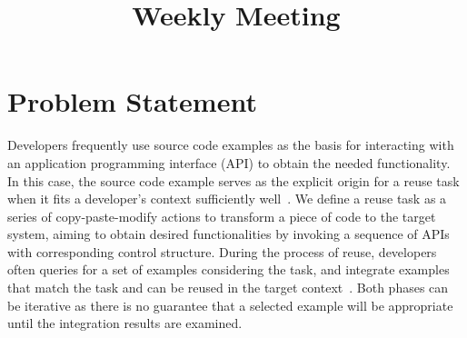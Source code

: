 \documentclass{sig-alternate}
\begin{document}



\title{Weekly Meeting } %

%
%

%
%
%

\maketitle

\section{Problem Statement}

Developers frequently use source code examples as the basis for interacting with an  application programming interface (API) to obtain the needed functionality.  In this case, the source code example serves as the explicit origin for a reuse task when it fits a developer's context sufficiently well~\cite{Frakes:reuseStatus05, Parsons:cognitiveReuse04}. We define a reuse task as a series of copy-paste-modify actions to transform a piece of code to the target system, aiming to obtain desired functionalities by invoking a sequence of APIs with corresponding control structure.  During the process of reuse, developers often queries for a set of examples considering the task, and integrate examples that match the task and can be reused in the target context~\cite{Holmes:reuseStudy09}. Both phases can be iterative as there is no guarantee that a selected example will be appropriate until the integration results are examined. 
\end{document}
